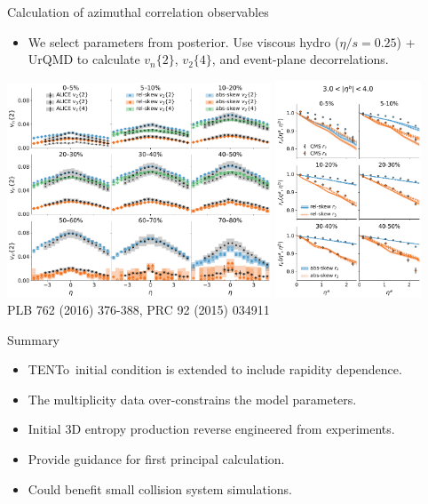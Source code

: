 \documentclass[11pt]{beamer}
\newcommand{\TRENTo}{T\raisebox{-0.2em}{R}ENTo~}
\begin{document}
\begin{frame}{Calculation of azimuthal correlation observables}
\begin{itemize}
\item We select parameters from posterior. Use viscous hydro ($\eta/s = 0.25$) + UrQMD to calculate $v_n\{2\}$, $v_2\{4\}$, and event-plane decorrelations.
\end{itemize}
\includegraphics[width=0.59\textwidth]{vn_eta.pdf}\hfill
\includegraphics[width=0.325\textwidth]{evt_pln_decorr_near.pdf}\\
\tiny PLB 762 (2016) 376-388, PRC 92 (2015) 034911
\end{frame}

\begin{frame}{Summary}
\begin{itemize}
\item \TRENTo initial condition is extended to include rapidity dependence.
\item The multiplicity data over-constrains the model parameters.
\item \colorbox{red!20}{Initial 3D entropy production reverse engineered
 from experiments.}
\item \colorbox{blue!20}{Provide guidance for first principal calculation.}
\item \colorbox{blue!20}{Could benefit small collision system simulations.}
\end{itemize}
\end{frame}
\end{document}
